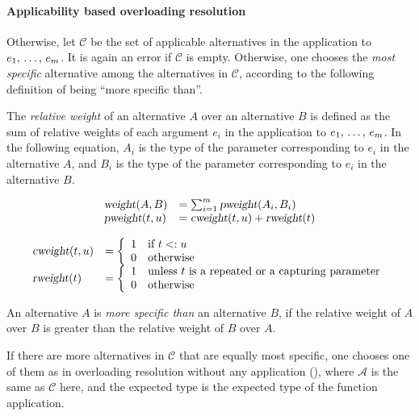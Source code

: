 \paragraph{Applicability based overloading resolution}
Otherwise, let $\mathcal{C}$ be the set of applicable alternatives in the application to $e_1 ,\, \ldots ,\, e_m$. It is again an error if $\mathcal{C}$ is empty. Otherwise, one chooses the {\em most specific} alternative among the alternatives in $\mathcal{C}$, according to the following definition of being  ``more specific than''.

\begin{definition}
The {\em relative weight} of an alternative $A$ over an alternative $B$ is defined as the sum of relative weights of each argument $e_i$ in the application to $e_1 ,\, \ldots ,\, e_m$. In the following equation, $A_i$ is the type of the parameter corresponding to $e_i$ in the alternative $A$, and $B_i$ is the type of the parameter corresponding to $e_i$ in the alternative $B$. 

\[\begin{array}{l l}
\mbox{\sl weight}(A, B) &= \sum_{i=1}^{m} \mbox{\sl pweight}(A_i, B_i) \\
\mbox{\sl pweight}(t, u) &= \mbox{\sl cweight}(t, u) + \mbox{\sl rweight}(t)
\end{array}
\]

\[\begin{array}{l l}
\mbox{\sl cweight}(t, u) &= \left\{ 
  \begin{array}{l l}
    1 & \textrm{if $t <: u$}\\
    0 & \textrm{otherwise}
  \end{array} \right. \\
\mbox{\sl rweight}(t) &= \left\{ 
  \begin{array}{l l}
    1 & \textrm{unless $t$ is a repeated or a capturing parameter}\\
    0 & \textrm{otherwise}
  \end{array} \right.
\end{array}\]
\end{definition}

An alternative $A$ is {\em more specific than} an alternative $B$, if the relative weight of $A$ over $B$ is greater than the relative weight of $B$ over $A$. 

If there are more alternatives in $\mathcal{C}$ that are equally most specific, one chooses one of them as in overloading resolution without any application (), where $\mathcal{A}$ is the same as $\mathcal{C}$ here, and the expected type is the expected type of the function application. 

